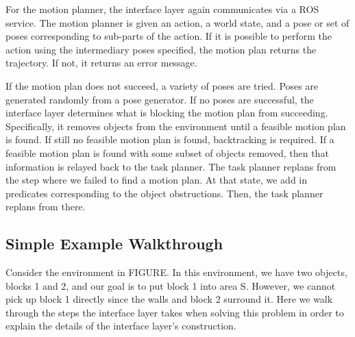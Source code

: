 \documentclass[12pt]{article}
\begin{document}
For the motion planner, the interface layer again communicates via a ROS service.  
The motion planner is given an action, a world state, and a pose or set of poses corresponding to sub-parts of the action.  
If it is possible to perform the action using the intermediary poses specified, the motion plan returns the trajectory.  
If not, it returns an error message.

If the motion plan does not succeed, a variety of poses are tried.  
Poses are generated randomly from a pose generator.  
If no poses are successful, the interface layer determines what is blocking the motion plan from succeeding.  
Specifically, it removes objects from the environment until a feasible motion plan is found.  
If still no feasible motion plan is found, backtracking is required.  
If a feasible motion plan is found with some subset of objects removed, then that information is relayed back to the task planner.  
The task planner replans from the step where we failed to find a motion plan.  
At that state, we add in predicates corresponding to the object obstructions.  
Then, the task planner replans from there.  


\subsection{Simple Example Walkthrough}

Consider the environment in FIGURE.  
In this environment, we have two objects, blocks 1 and 2, and our goal is to put block 1 into area S.  
However, we cannot pick up block 1 directly since the walls and block 2 surround it.  
Here we walk through the steps the interface layer takes when solving this problem in order to explain the details of the interface layer's construction.
\end{document}
